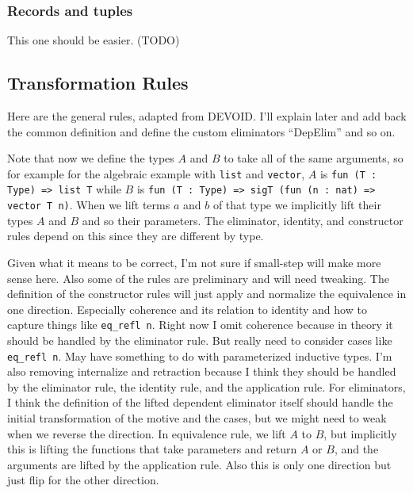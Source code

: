 \subsubsection{Records and tuples}

This one should be easier. (TODO)

\subsection{Transformation Rules}

Here are the general rules, adapted from DEVOID.
I'll explain later and add back the common definition and define the custom eliminators ``DepElim'' and so on.

Note that now we define the types $A$ and $B$ to take all of the same arguments, so for example for the algebraic
example with \lstinline{list} and \lstinline{vector}, $A$ is \lstinline{fun (T : Type) => list T} while $B$
is \lstinline{fun (T : Type) => sigT (fun (n : nat) => vector T n)}. When we lift terms $a$ and $b$ of that type
we implicitly lift their types $A$ and $B$ and so their parameters. The eliminator, identity, and constructor rules
depend on this since they are different by type.

Given what it means to be correct, I'm not sure if small-step will make more sense here.
Also some of the rules are preliminary and will need tweaking.
The definition of the constructor rules will just apply and normalize the equivalence in one direction.
Especially coherence and its relation to identity and how to capture things like \lstinline{eq_refl n}.
Right now I omit coherence because in theory it should be handled by the eliminator rule.
But really need to consider cases like \lstinline{eq_refl n}.
May have something to do with parameterized inductive types.
I'm also removing internalize and retraction because I think they should be handled
by the eliminator rule, the identity rule, and the application rule.
For eliminators, I think the definition of the lifted dependent eliminator itself should handle the initial transformation
of the motive and the cases, but we might need to weak when we reverse the direction.
In equivalence rule, we lift $A$ to $B$, but implicitly this is lifting the functions that take parameters and return $A$ or $B$,
and the arguments are lifted by the application rule.
Also this is only one direction but just flip for the other direction.

